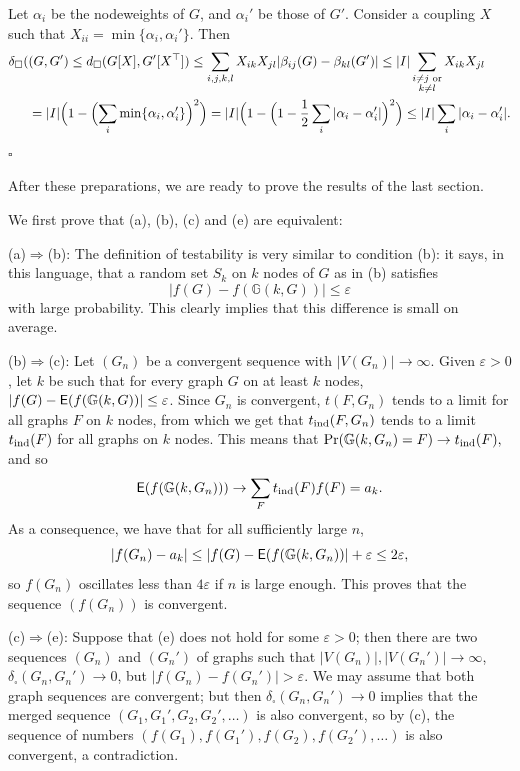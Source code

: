 \documentclass[12pt]{article}
\numberwithin{equation}{section}
\newenvironment{proof}{\medskip\noindent{\bf Proof.
}}{\hfill$\square$\medskip}
\def\bsa{\begin{subarray}{c} }
\def\esa{\end{subarray} }
\def\ind{{\rm ind}}
\def\eps{\varepsilon}
\def\E{{\sf E}}
\def\T{{^\top}}
\def\RandG{{\mathbb G}}
\begin{document}
\begin{proof}
Let $\alpha_i$ be the nodeweights of $G$, and
$\alpha_i'$ be those of $G'$.  Consider a coupling
$X$ such that $X_{ii}=\min\{\alpha_i,\alpha_i'\}$.
Then
\[
\begin{aligned}
\delta_\square(&(G,G')\leq
d_\square(G[X],G'[X\T])
\leq
\sum_{i,j,k,l}
X_{ik}X_{jl}|\beta_{ij}(G)-\beta_{kl}(G')|
\leq |I|
\sum_{\bsa i\neq j\text{ or}\\ k\neq l\esa}X_{ik}X_{jl}
\\
&=|I|\Bigl(1-\Bigl(\sum_i\min\{\alpha_i,\alpha_i'\}\Bigr)^2\Bigr)
=|I|\Bigl(1-\Bigl(1-\frac 12\sum_i|\alpha_i-\alpha_i'|\Bigr)^2\Bigr)
\leq |I|\sum_i|\alpha_i-\alpha_i'|.
\end{aligned}
\]
\vskip -10pt
\end{proof}

After these preparations, we are ready to prove the results of the last
section.

\bigskip
{} We first prove
that (a), (b), (c) and (e) are equivalent:

\smallskip

(a)$\Rightarrow$(b): The definition of testability is very similar to
condition (b): it says, in this language, that a random set $S_k$ on
$k$ nodes of $G$ as in (b) satisfies
\[
|f(G)-f(\RandG(k,G))| \leq\eps
\]
with large probability. This clearly implies that this difference is
small on average.

\smallskip

(b)$\Rightarrow$(c): Let $(G_n)$ be a convergent sequence with
$|V(G_n)|\to\infty$. Given $\eps>0$, let $k$ be such that for every
graph $G$ on at least $k$ nodes, $|f(G)-\E(f(\RandG(k,G))|\le\eps$.
Since $G_n$ is convergent, $t(F,G_n)$ tends to a limit for all graphs
$F$ on  $k$ nodes, from which we get that $t_\ind(F,G_n)$ tends to a
limit $t_\ind(F)$ for all graphs on  $k$ nodes. This means that $
\Pr(\RandG(k,G_n)=F)\to t_\ind(F), $ and so
\[
\E(f(\RandG(k,G_n)))\to \sum_F t_\ind(F) f(F)=a_k.
\]
As a consequence, we have that for all sufficiently large $n$,
\[
|f(G_n)-a_k|\le|f(G)-\E(f(\RandG(k,G_n))|+\eps\le2\eps,
\]
so $f(G_n)$ oscillates less than $4\eps$ if $n$ is large enough. This
proves that the sequence $(f(G_n))$ is convergent.

\smallskip

(c)$\Rightarrow$(e): Suppose that (e) does not hold for some
$\eps>0$; then there are two sequences $(G_n)$ and $(G_n')$ of graphs
such that $|V(G_n)|,|V(G_n')|\to\infty$, $\delta_\square(G_n,G_n')\to
0$, but $|f(G_n)-f(G_n')|>\eps$. We may assume that both graph
sequences are convergent; but then ${\delta}_\square(G_n,G_n')\to 0$
implies that the merged sequence $(G_1,G_1',G_2,G_2',\dots)$ is also
convergent, so by (c), the sequence of numbers
$(f(G_1),f(G_1'),f(G_2),f(G_2'),\dots)$ is also convergent, a
contradiction.
\end{document}
